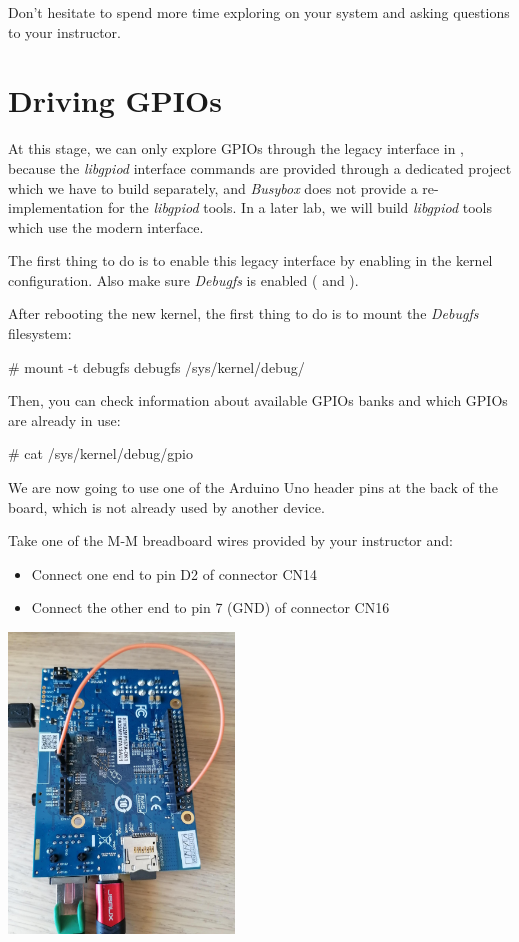 Don't hesitate to spend more time exploring  on your system
and asking questions to your instructor.

\section{Driving GPIOs}

At this stage, we can only explore GPIOs through the legacy interface
in , because the {\em libgpiod} interface
commands are provided through a dedicated project which we have to
build separately, and {\em Busybox} does not provide a
re-implementation for the {\em libgpiod} tools. In a later lab, we
will build {\em libgpiod} tools which use the modern
 interface.

The first thing to do is to enable this legacy interface by enabling
 in the kernel configuration. Also make sure
{\em Debugfs} is enabled ( and
).

After rebooting the new kernel, the first thing to do is to mount
the {\em Debugfs} filesystem:

\begin{bashinput}
# mount -t debugfs debugfs /sys/kernel/debug/
\end{bashinput}

Then, you can check information about available GPIOs banks and which
GPIOs are already in use:

\begin{bashinput}
# cat /sys/kernel/debug/gpio
\end{bashinput}

We are now going to use one of the Arduino Uno header pins at the back
of the board, which is not already used by another device.

Take one of the M-M breadboard wires provided by your instructor and:
\begin{itemize}
  \item Connect one end to pin D2 of connector CN14
  \item Connect the other end to pin 7 (GND) of connector CN16
\end{itemize}

\includegraphics[width=6cm]{labs/sysdev-accessing-hardware/dk1-board-gpio-connected-to-gnd.jpg}

